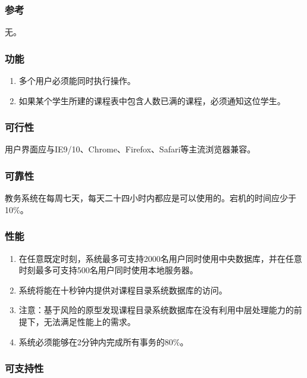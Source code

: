 \subsubsection{参考}
无。
  
\subsubsection{功能}
  
  \begin{enumerate}
    \item 多个用户必须能同时执行操作。
    \item 如果某个学生所建的课程表中包含人数已满的课程，必须通知这位学生。
  \end{enumerate}
  
\subsubsection{可行性}
  
用户界面应与IE9/10、Chrome、Firefox、Safari等主流浏览器兼容。
  
\subsubsection{可靠性}
  
教务系统在每周七天，每天二十四小时内都应是可以使用的。宕机的时间应少于10\%。
  
\subsubsection{性能}
  
  \begin{enumerate}
    \item 在任意既定时刻，系统最多可支持2000名用户同时使用中央数据库，并在任意时刻最多可支持500名用户同时使用本地服务器。
    \item 系统将能在十秒钟内提供对课程目录系统数据库的访问。
    \item 注意：基于风险的原型发现课程目录系统数据库在没有利用中层处理能力的前提下，无法满足性能上的需求。
    \item 系统必须能够在2分钟内完成所有事务的80\%。
  \end{enumerate}
  
\subsubsection{可支持性}
  
